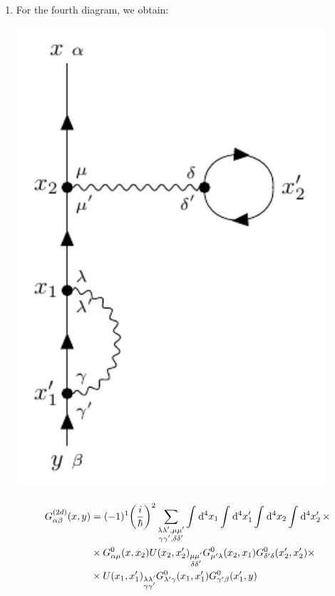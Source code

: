 \documentclass[11pt, a4paper, twoside, openright]{article}
\begin{document}
\begin{enumerate}[label=(\alph*)]
\item For the fourth diagram, we obtain:

\begin{minipage}[]{0.35\linewidth}
\centering
\includegraphics[width=0.9\textwidth]{images/D_label_c.pdf}
\label{}
\end{minipage}
\begin{minipage}[c]{0.65\linewidth}
\begin{equation}
\begin{split}
  G_{\alpha \beta }^{(2d)} (x,y) &= (-1)^1 \qty(\frac{i}{\hbar })^2
   \sum_{\substack{\lambda \lambda', \mu \mu' \\ \gamma \gamma', \delta \delta'   } }^{} \int_{}^{} \dd[4]{x_1} \int_{}^{} \dd[4]{x_1'} \int_{}^{} \dd[4]{x_2} \int_{}^{} \dd[4]{x_2'} \times \\
  & \times G_{\alpha \mu }^0 (x,x_2) U(x_2,x_2')_{\substack{ \mu \mu' \\ \delta \delta'} } G^0_{\mu' \lambda } (x_2,x_1) G^0_{\delta' \delta } (x_2',x_2') \times \\
  & \times U(x_1,x_1')_{\substack{ \lambda \lambda' \\ \gamma \gamma'} }
  G^0_{\lambda' \gamma } (x_1,x_1') G^0_{\gamma' \beta } (x_1',y)
\end{split}
\end{equation}
\end{minipage}

\end{enumerate}
\end{document}
